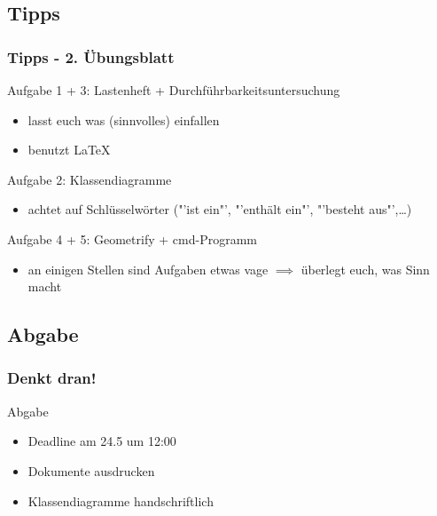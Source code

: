 \documentclass[18pt]{beamer}
\begin{document}
	\subsection{Tipps}
	\begin{frame}
		\frametitle{Tipps - 2. Übungsblatt}
		\begin{small}
			\begin{exampleblock}{Aufgabe 1 + 3: Lastenheft + Durchführbarkeitsuntersuchung}
				\begin{itemize}
					\item lasst euch was (sinnvolles) einfallen
					\item benutzt \LaTeX
				\end{itemize}
			\end{exampleblock}
			\pause
			\begin{exampleblock}{Aufgabe 2: Klassendiagramme}
				\begin{itemize}
					\item achtet auf Schlüsselwörter ("'ist ein"', "'enthält ein"', "'besteht aus"',\dots)
				\end{itemize}
			\end{exampleblock}
			\pause
			\begin{exampleblock}{Aufgabe 4 + 5: Geometrify + cmd-Programm}
				\begin{itemize}
					\item an einigen Stellen sind Aufgaben etwas vage
					\linebreak $\implies$ überlegt euch, was Sinn macht
				\end{itemize}
			\end{exampleblock}
		\end{small}
	\end{frame}
	
	\subsection{Abgabe}
	\begin{frame}
		\frametitle{Denkt dran!}
		\begin{alertblock}{Abgabe}
			\begin{itemize}
				\item Deadline am 24.5 um 12:00
				\item Dokumente ausdrucken
				\item Klassendiagramme handschriftlich
			\end{itemize}
		\end{alertblock}
	\end{frame}
		
\end{document}
